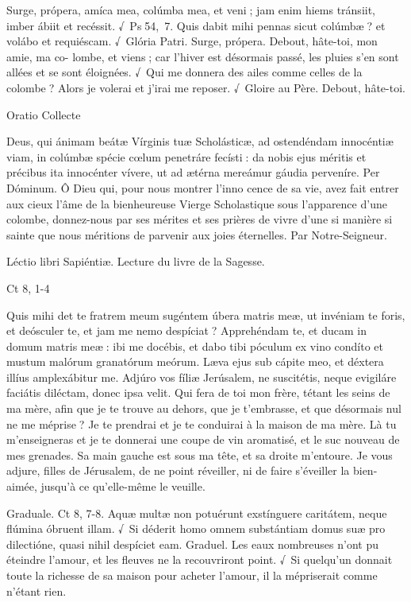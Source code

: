 \begin{paracol}{2}
Surge, própera, amíca mea, colúmba  mea, et veni ; jam enim hiems tránsiit, imber ábiit et recéssit. √~Ps 54, 7. Quis dabit mihi pennas sicut colúmbæ ? et volábo et requiéscam. √~Glória Patri. Surge, própera.
\switchcolumn
Debout, hâte-toi, mon amie, ma co- lombe, et viens ; car l’hiver est désormais passé, les pluies s’en sont allées et se sont éloignées. √~Qui me donnera des ailes comme celles de la colombe ? Alors je volerai et j’irai me reposer. √~Gloire au Père. Debout, hâte-toi.
\switchcolumn*

Oratio
\switchcolumn
Collecte
\switchcolumn*

Deus, qui ánimam beátæ Vírginis  tuæ Scholásticæ, ad ostendéndam innocéntiæ viam, in colúmbæ spécie cœlum penetráre fecísti : da nobis ejus méritis et précibus ita innocénter vívere, ut ad ætérna mereámur gáudia perveníre. Per Dóminum.
\switchcolumn
Ô Dieu qui, pour nous montrer l’inno cence de sa vie, avez fait entrer aux cieux l’âme de la bienheureuse Vierge Scholastique sous l’apparence d’une colombe, donnez-nous  par ses mérites et ses prières de vivre d’une si manière si sainte que nous méritions de parvenir aux joies éternelles. Par Notre-Seigneur.
\switchcolumn*

Léctio libri Sapiéntiæ.
\switchcolumn
Lecture du livre de la Sagesse.
\switchcolumn*

Ct 8, 1-4
\switchcolumn

\switchcolumn*

Quis mihi det te fratrem meum  sugéntem úbera matris meæ, ut invéniam te foris, et deósculer te, et jam me nemo despíciat ? Apprehéndam te, et ducam in domum matris meæ : ibi me docébis, et dabo tibi póculum ex vino condíto et mustum malórum granatórum meórum. Læva ejus sub cápite meo, et déxtera illíus amplexábitur me. Adjúro vos fíliæ Jerúsalem, ne suscitétis, neque evigiláre faciátis diléctam, donec ipsa velit.
\switchcolumn
Qui fera de toi mon frère, tétant les seins  de ma mère, afin que je te trouve au dehors, que je t’embrasse, et que désormais nul ne me méprise ? Je te prendrai et je te conduirai à la maison de ma mère. Là tu m’enseigneras et je te donnerai une coupe de vin aromatisé, et le suc nouveau de mes grenades. Sa main gauche est sous ma tête, et sa droite m’entoure. Je vous adjure, filles de Jérusalem, de ne point réveiller, ni de faire s’éveiller la bien-aimée, jusqu’à ce qu’elle-même le veuille.
\switchcolumn*

Graduale. Ct 8, 7-8. Aquæ multæ non potuérunt exstínguere caritátem, neque flúmina óbruent illam. √~Si déderit homo omnem substántiam domus suæ pro dilectióne, quasi nihil despíciet eam.
\switchcolumn
Graduel. Les eaux nombreuses n’ont pu éteindre l’amour, et les fleuves ne la recouvriront point. √~Si quelqu’un donnait toute la richesse de sa maison pour acheter l’amour, il la mépriserait comme n’étant rien.
\switchcolumn*


\end{paracol}
